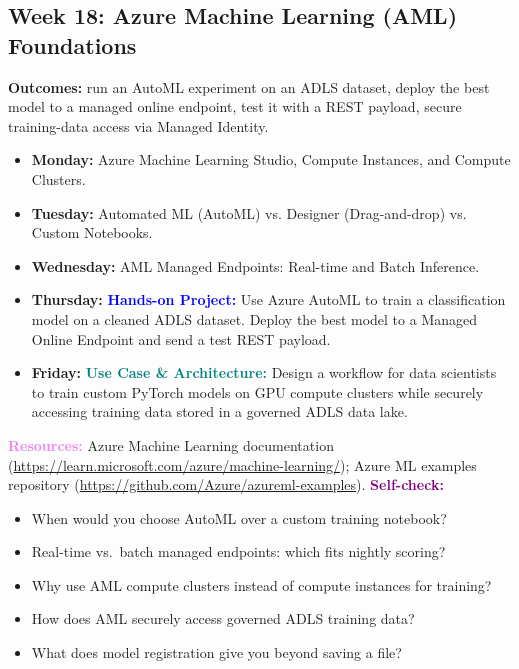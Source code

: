 \documentclass[11pt, a4paper]{article}
\newcommand{\project}[1]{\vspace{1mm}\noindent\textbf{\textcolor{blue}{Hands-on Project:}} #1}
\newcommand{\usecase}[1]{\vspace{1mm}\noindent\textbf{\textcolor{teal}{Use Case \& Architecture:}} #1}
\newcommand{\dayitem}[2]{\item \textbf{#1:} #2}
\newcommand{\resources}[1]{\vspace{1mm}\noindent\textbf{\textcolor{violet}{Resources:}} #1}
\newcommand{\selfcheck}[1]{\vspace{1mm}\noindent\textbf{\textcolor{purple}{Self-check:}} #1}
\begin{document}
\subsection*{Week 18: Azure Machine Learning (AML) Foundations}
\par\noindent\textbf{Outcomes:} run an AutoML experiment on an ADLS dataset, deploy the best model to a managed online endpoint, test it with a REST payload, secure training-data access via Managed Identity.
\begin{itemize}[label=-]
    \dayitem{Monday}{Azure Machine Learning Studio, Compute Instances, and Compute Clusters.}
    \dayitem{Tuesday}{Automated ML (AutoML) vs. Designer (Drag-and-drop) vs. Custom Notebooks.}
    \dayitem{Wednesday}{AML Managed Endpoints: Real-time and Batch Inference.}
    \dayitem{Thursday}{\project{Use Azure AutoML to train a classification model on a cleaned ADLS dataset. Deploy the best model to a Managed Online Endpoint and send a test REST payload.}}
    \dayitem{Friday}{\usecase{Design a workflow for data scientists to train custom PyTorch models on GPU compute clusters while securely accessing training data stored in a governed ADLS data lake.}}
\end{itemize}
\resources{Azure Machine Learning documentation (\url{https://learn.microsoft.com/azure/machine-learning/}); Azure ML examples repository (\url{https://github.com/Azure/azureml-examples}).}
\selfcheck{\begin{itemize}[label=-, itemsep=0pt]
    \item When would you choose AutoML over a custom training notebook?
    \item Real-time vs.\ batch managed endpoints: which fits nightly scoring?
    \item Why use AML compute clusters instead of compute instances for training?
    \item How does AML securely access governed ADLS training data?
    \item What does model registration give you beyond saving a file?
\end{itemize}}
\end{document}
